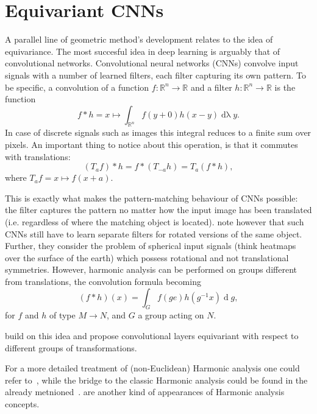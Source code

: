 \section{Equivariant CNNs} \label{sec:equivariant}

A parallel line of geometric method's development relates to the idea of
equivariance. The most succesful idea in deep learning is arguably that of
convolutional networks. Convolutional neural networks (CNNs) convolve
input signals with a number of learned filters, each filter capturing
its own pattern. To be specific, a convolution of a function \( f: \mathbb{R}^n
\to \mathbb{R} \) and a filter \( h: \mathbb{R}^n \to \mathbb{R} \) is the
function~\cite{feichtingerFAHA}
\[ f*h = x \mapsto \int_{\mathbb{R}^n} f(y + 0) h(x-y)
\operatorname{d\lambda} y. \]
In case of discrete signals such as images this
integral reduces to a finite sum over pixels. An important thing to notice
about this operation, is that it commutes with translations:
\[ (T_a f) * h = f * (T_{-a} h) = T_a (f * h), \]
where \( T_a f = x \mapsto f(x + a) \).

This is exactly what makes the pattern-matching behaviour of CNNs possible: the
filter captures the pattern no matter how the input image has been translated
(i.e. regardless of where the matching object is located). \citet{s2cnn} note
however that such CNNs still have to learn separate filters for rotated
versions of the same object. Further, they consider the problem of spherical
input signals (think heatmaps over the surface of the earth) which possess
rotational and not translational symmetries. However, harmonic analysis can be
performed on groups different from translations, the convolution
formula becoming
\[
(f * h)(x) = \int_G f(g e) h(g^{-1}x) \operatorname{d}g,
\]
for \( f \) and \( h \) of type \( M\to N \), and \( G \) a group acting on
\( N \).

\citet{s2cnn,cohen2018general,e2cnn} build on this idea and propose
convolutional layers equivariant with respect to different groups of
transformations.

For a more detailed treatment of (non-Euclidean) Harmonic analysis one could
refer
to~\citet{axlerHarmonic,
elliott2019generalized,
explorationsHarmonic,
benedettoHarmonic,
stollharmonic,
terrasHarmonicSymmetric,
terrasHarmonicSymmetric2,
fourierS2},
while the bridge to the classic Harmonic analysis could be found in the already
metnioned~\cite{feichtingerFAHA}.
\citet{eyeRotations,zhou2019glosh,scnnNiessner} are another kind of appearances
of Harmonic analysis concepts.

